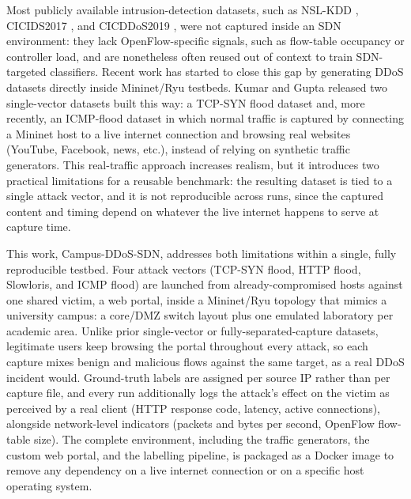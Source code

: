 \documentclass[a4paper,fleqn]{cas-dc}
\begin{document}
Most publicly available intrusion-detection datasets, such as
NSL-KDD \citep{tavallaee2009nslkdd}, CICIDS2017
\citep{sharafaldin2018cicflowmeter}, and CICDDoS2019
\citep{sharafaldin2019cicddos2019}, were not captured inside an SDN
environment: they lack OpenFlow-specific signals, such as flow-table
occupancy or controller load, and are nonetheless often reused out of
context to train SDN-targeted classifiers. Recent work has started to
close this gap by generating DDoS datasets directly inside Mininet/Ryu
testbeds. Kumar and Gupta released two single-vector datasets built
this way: a TCP-SYN flood dataset \citep{kumar2025synflood} and, more
recently, an ICMP-flood dataset \citep{kumar2026icmpfloodsdn} in which
normal traffic is captured by connecting a Mininet host to a live
internet connection and browsing real websites (YouTube, Facebook,
news, etc.), instead of relying on synthetic traffic generators. This
real-traffic approach increases realism, but it introduces two
practical limitations for a reusable benchmark: the resulting dataset
is tied to a single attack vector, and it is not reproducible across
runs, since the captured content and timing depend on whatever the
live internet happens to serve at capture time.

This work, Campus-DDoS-SDN, addresses both limitations within a
single, fully reproducible testbed. Four attack vectors (TCP-SYN
flood, HTTP flood, Slowloris, and ICMP flood) are launched from
already-compromised hosts against one shared victim, a web portal,
inside a Mininet/Ryu topology that mimics a university campus: a
core/DMZ switch layout plus one emulated laboratory per academic
area. Unlike prior single-vector or fully-separated-capture datasets,
legitimate users keep browsing the portal throughout every attack, so
each capture mixes benign and malicious flows against the same
target, as a real DDoS incident would. Ground-truth labels are
assigned per source IP rather than per capture file, and every run
additionally logs the attack's effect on the victim as perceived by a
real client (HTTP response code, latency, active connections),
alongside network-level indicators (packets and bytes per second,
OpenFlow flow-table size). The complete environment, including the
traffic generators, the custom web portal, and the labelling
pipeline, is packaged as a Docker image to remove any dependency on a
live internet connection or on a specific host operating system.
\end{document}
